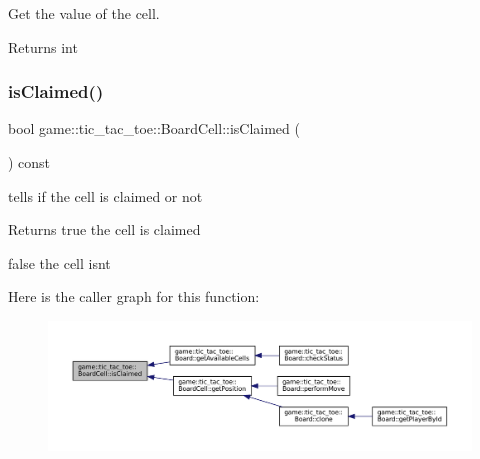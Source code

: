 Get the value of the cell. 

\begin{DoxyReturn}{Returns}
int 
\end{DoxyReturn}
\mbox{\label{classgame_1_1tic__tac__toe_1_1_board_cell_a800b9a8409ad28086ad1e7cb275fa25e}} 
\subsubsection{\texorpdfstring{is\+Claimed()}{isClaimed()}}
{\footnotesize\ttfamily bool game\+::tic\+\_\+tac\+\_\+toe\+::\+Board\+Cell\+::is\+Claimed (\begin{DoxyParamCaption}{ }\end{DoxyParamCaption}) const}



tells if the cell is claimed or not 

\begin{DoxyReturn}{Returns}
true the cell is claimed 

false the cell isn\textquotesingle{}t 
\end{DoxyReturn}
Here is the caller graph for this function\+:
\nopagebreak
\begin{figure}[H]
\begin{center}
\leavevmode
\includegraphics[width=350pt]{classgame_1_1tic__tac__toe_1_1_board_cell_a800b9a8409ad28086ad1e7cb275fa25e_icgraph}
\end{center}
\end{figure}
\mbox{\label{classgame_1_1tic__tac__toe_1_1_board_cell_a3ee72b5b70a0d0eb8abbe4cdcdf4038d}} 
